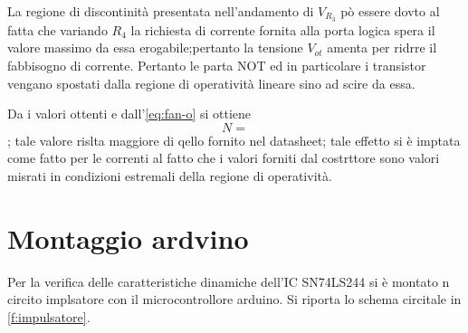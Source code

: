 	La regione di discontinità presentata nell'andamento di $V_{R_{3}}$
	pò essere dovto al fatta che variando $R_{4}$ la richiesta di corrente fornita alla porta logica spera il valore massimo da essa erogabile;pertanto la tensione $V_{ot}$ amenta per ridrre il fabbisogno di corrente.
	Pertanto le parta NOT ed in particolare i transistor vengano spostati dalla regione di operatività lineare sino ad scire da  essa.
	
	Da i valori ottenti e dall'\eqref{eq:fan-o} si ottiene $$N=$$; tale valore rislta maggiore di qello fornito nel datasheet; tale effetto si è imptata come fatto per le correnti al fatto che i valori forniti dal costrttore sono valori misrati in condizioni estremali della regione di operatività.
	
\section{Montaggio ardvino}
	Per la verifica delle caratteristiche dinamiche dell'IC SN74LS244 si è montato n circito implsatore con il microcontrollore arduino.
	Si riporta lo schema circitale in \figurename{ \ref{f:impulsatore}}. 
	
